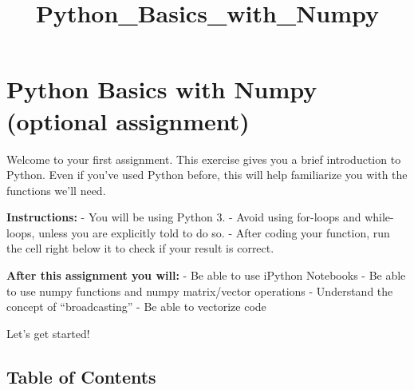 \documentclass[11pt]{article}
\title{Python\_Basics\_with\_Numpy}
\begin{document}
    
    \maketitle
    
    

    
    \hypertarget{python-basics-with-numpy-optional-assignment}{%
\section{Python Basics with Numpy (optional
assignment)}\label{python-basics-with-numpy-optional-assignment}}

Welcome to your first assignment. This exercise gives you a brief
introduction to Python. Even if you've used Python before, this will
help familiarize you with the functions we'll need.

\textbf{Instructions:} - You will be using Python 3. - Avoid using
for-loops and while-loops, unless you are explicitly told to do so. -
After coding your function, run the cell right below it to check if your
result is correct.

\textbf{After this assignment you will:} - Be able to use iPython
Notebooks - Be able to use numpy functions and numpy matrix/vector
operations - Understand the concept of ``broadcasting'' - Be able to
vectorize code

Let's get started!

    \hypertarget{table-of-contents}{%
\subsection{Table of Contents}\label{table-of-contents}}
\end{document}
